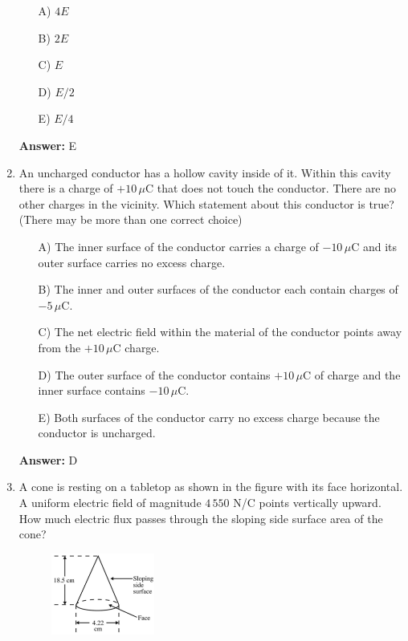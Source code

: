 \begin{enumerate}
    \begin{multicols}{5}
    \begin{itemize}
        \item[A)] $4E$
        \item[B)] $2E$
        \item[C)] $E$
        \item[D)] $E/2$
        \item[E)] $E/4$
    \end{itemize}
    \end{multicols}

    \textbf{Answer:} E

    \item An uncharged conductor has a hollow cavity inside of it. Within this cavity there is a charge of $+10\,\mu$C that does not touch the conductor. There are no other charges in the vicinity. Which statement about this conductor is true? (There may be more than one correct choice)
    
    \begin{itemize}
        \item[A)] The inner surface of the conductor carries a charge of $-10\,\mu$C and its outer surface carries no excess charge.
        \item[B)] The inner and outer surfaces of the conductor each contain charges of $-5\,\mu$C.
        \item[C)] The net electric field within the material of the conductor points away from the $+10\,\mu$C charge.
        \item[D)] The outer surface of the conductor contains $+10\,\mu$C of charge and the inner surface contains $-10\,\mu$C.
        \item[E)] Both surfaces of the conductor carry no excess charge because the conductor is uncharged.
    \end{itemize}

    \textbf{Answer:} D

    \item A cone is resting on a tabletop as shown in the figure with its face horizontal. A uniform electric field of magnitude $4\,550$ N/C points vertically upward. How much electric flux passes through the sloping side surface area of the cone?

    \begin{figure}[H]
        \centering
        \includegraphics[width=0.32\textwidth]{figures-workshop01/problem-23.png}
    \end{figure}


\end{enumerate}
